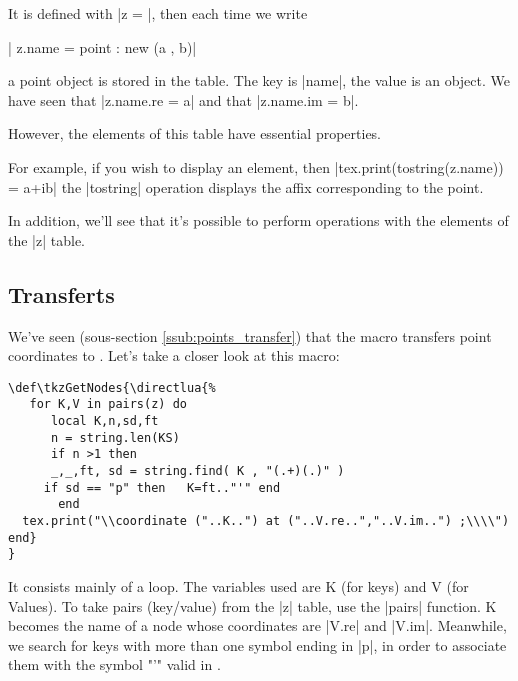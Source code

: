 It is defined with |z = {}|, then each time we write

\begin{mybox}
   | z.name = point : new (a , b)|
\end{mybox}

a point object is stored in the table. The key is |name|, the value is an object. We have seen that |z.name.re = a| and that |z.name.im = b|.

However, the elements of this table have essential properties.

For example, if you wish to display an element, then |tex.print(tostring(z.name)) = a+ib| the |tostring| operation displays the affix corresponding to the point.

In addition, we'll see that it's possible to perform operations with the elements of the |z| table.

\subsection{Transferts} %
\label{sub:transferts}

We've seen (sous-section \ref{ssub:points_transfer}) that the macro  transfers point coordinates to \TIKZ. Let's take a closer look at this macro:

\vspace*{1em}

\begin{mybox}
\begin{verbatim}
\def\tkzGetNodes{\directlua{%
   for K,V in pairs(z) do
      local K,n,sd,ft
      n = string.len(KS)
      if n >1 then
      _,_,ft, sd = string.find( K , "(.+)(.)" )  
     if sd == "p" then   K=ft.."'" end  
       end    
  tex.print("\\coordinate ("..K..") at ("..V.re..","..V.im..") ;\\\\")
end}
}\end{verbatim}
\end{mybox}

It consists mainly of a loop. The variables used are K (for keys) and V (for Values). To take pairs (key/value) from the |z| table, use the |pairs| function. K becomes the name of a node whose coordinates are |V.re| and |V.im|. Meanwhile, we search for keys with more than one symbol ending in |p|, in order to associate them with the symbol "'" valid in \TIKZ{}.


